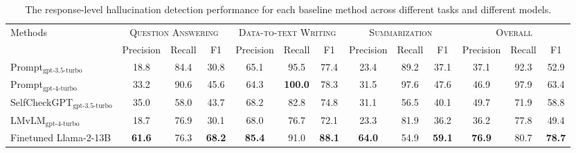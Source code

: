 \documentclass[11pt]{article}
\begin{document}
\begin{table}[t]
\scriptsize
\centering
    \begin{tabular}{l|ccccccccc|ccc}
    \toprule
    \multirow{2}{*}{Methods}
     & \multicolumn{3}{c}{\textsc{Question Answering}} & \multicolumn{3}{c}{\textsc{Data-to-text Writing}} & \multicolumn{3}{c}{\textsc{Summarization}} & \multicolumn{3}{c}{\textsc{Overall}}  \\
     \cmidrule(lr){2-4} \cmidrule(lr){5-7} \cmidrule(lr){8-10}  \cmidrule(lr){11-13} 
     & Precision & Recall & F1 & Precision & Recall & F1 & Precision & Recall & F1 & Precision & Recall & F1\\
     \midrule
     Prompt$_\textrm{gpt-3.5-turbo}$ & 18.8 & 84.4 & 30.8 & 65.1 & 95.5 & 77.4 & 23.4 & 89.2 & 37.1 & 37.1 & 92.3 & 52.9\\
     Prompt$_\textrm{gpt-4-turbo}$ & 33.2 & 90.6 & 45.6 & 64.3 & \textbf{100.0} & 78.3 & 31.5 & 97.6 & 47.6 & 46.9 & 97.9 & 63.4\\
     SelfCheckGPT$_\textrm{gpt-3.5-turbo}$ & 35.0 & 58.0 & 43.7 & 68.2 & 82.8 & 74.8 & 31.1  & 56.5 & 40.1 & 49.7 & 71.9 & 58.8\\
     LMvLM$_\textrm{gpt-4-turbo}$ & 18.7 & 76.9 & 30.1 &68.0 & 76.7 & 72.1 & 23.3 & 81.9 & 36.2 & 36.2 & 77.8 & 49.4\\
     Finetuned Llama-2-13B & \textbf{61.6} & 76.3 & \textbf{68.2} & \textbf{85.4} & 91.0 &\textbf{88.1} & \textbf{64.0} & 54.9 &\textbf{59.1} &\textbf{76.9} & 80.7 & \textbf{78.7}  \\
    \bottomrule
    \end{tabular}
    \caption{The response-level hallucination detection performance for each baseline method across different tasks and different models. 
    }
    \label{tab:5-detection-result}
\end{table}
\end{document}
